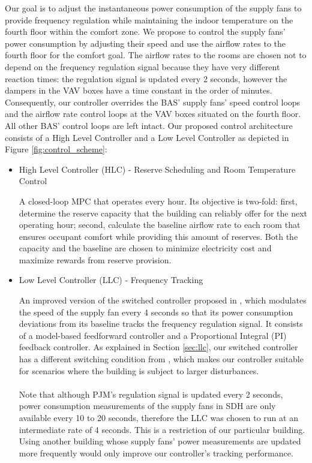 Our goal is to adjust the instantaneous power consumption of the supply fans to provide frequency regulation while maintaining the indoor temperature on the fourth floor within the comfort zone.
We propose to control the supply fans' power consumption by adjusting their speed and use the airflow rates to the fourth floor for the comfort goal.
The airflow rates to the rooms are chosen not to depend on the frequency regulation signal because they have very different reaction times: the regulation signal is updated every 2 seconds, however the dampers in the VAV boxes have a  time constant in the order of minutes.
Consequently, our controller overrides the BAS' supply fans' speed control loops and the airflow rate control loops at the VAV boxes situated on the fourth floor. 
All other BAS' control loops are left intact.
Our proposed control architecture consists of a High Level Controller and a Low Level Controller as depicted in Figure \ref{fig:control_scheme}:

\begin{itemize}
	\item{High Level Controller (HLC) - Reserve Scheduling and Room Temperature Control}\label{sec:high_level}

A closed-loop MPC that operates every hour. Its objective is two-fold: first, determine the reserve capacity that the building can reliably offer for the next operating hour; second, calculate the baseline airflow rate to each room that ensures occupant comfort while providing this amount of reserves.
Both the capacity and the baseline are chosen to minimize electricity cost and maximize rewards from reserve provision.

	\item{Low Level Controller (LLC) - Frequency Tracking}\label{sec:low_level}

An improved version of the switched controller proposed in \cite{Vrettos:2016flexlab1}, which modulates the speed of the supply fan every 4 seconds so that its power consumption deviations from its baseline tracks the frequency regulation signal.
It consists of a model-based feedforward controller and a Proportional Integral (PI) feedback controller.
As explained in Section \ref{sec:llc}, our switched controller has a different switching condition from \cite{Vrettos:2016flexlab1}, which makes our controller suitable for scenarios where the building is subject to larger disturbances.
\\
\\
Note that although PJM's regulation signal is updated every 2 seconds, power consumption measurements of the supply fans in SDH are only available every 10 to 20 seconds, therefore the LLC was chosen to run at an intermediate rate of 4 seconds. This is a restriction of our particular building. Using another building whose supply fans' power measurements are updated more frequently would only improve our controller's tracking performance.
\end{itemize}


